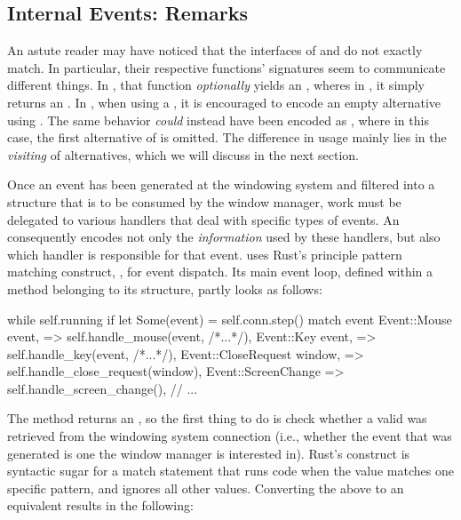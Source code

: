\subsection{Internal Events: Remarks}

An astute reader may have noticed that the  interfaces of
\wmrs and \wmcpp do not exactly match. In particular, their respective
 functions' signatures seem to communicate different things. In
\wmrs, that function \textit{optionally} yields an , wheres
in \wmcpp, it simply returns an . In \cpp, when using a
, it is encouraged to encode an empty alternative using
\cite{cppstd}. The same behavior \textit{could} instead
have been encoded as , where in this case, the first
alternative of  is omitted. The difference in usage mainly lies in
the \textit{visiting} of  alternatives, which we will discuss in
the next section.


Once an event has been generated at the windowing system and filtered into a
structure that is to be consumed by the window manager, work must be delegated
to various handlers that deal with specific types of events. An 
consequently encodes not only the \textit{information} used by these handlers,
but also which handler is responsible for that event. \wmrs uses Rust's
principle pattern matching construct, , for event dispatch. Its main
event loop, defined within a method belonging to its  structure,
partly looks as follows:

\begin{rustblock}
  while self.running {
    if let Some(event) = self.conn.step() {
      match event {
        Event::Mouse { event, }
          => self.handle_mouse(event, /*...*/),
        Event::Key { event, }
          => self.handle_key(event, /*...*/),
        Event::CloseRequest { window, }
          => self.handle_close_request(window),
        Event::ScreenChange
          => self.handle_screen_change(),
        // ...
      }
    }
  }
\end{rustblock}

The  method returns an , so the first thing to do
is check whether a valid  was retrieved from the windowing system
connection (i.e., whether the event that was generated is one the window manager
is interested in). Rust's  construct is syntactic sugar for a
match statement that runs code when the value matches one specific pattern, and
ignores all other values\cite{therustbook}. Converting the above 
to an equivalent  results in the following:

